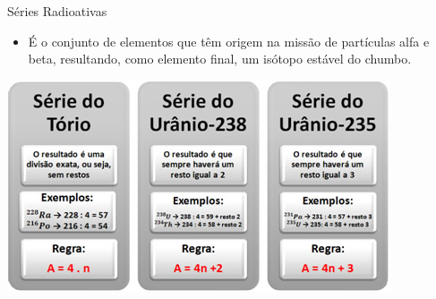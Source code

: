 \documentclass[presentation,professionalfonts,aspectratio=169]{beamer}
\begin{document}
\begin{frame}[label={sec:orgf94ec5a}]{Séries Radioativas}
\begin{itemize}
\item É o conjunto de elementos que têm origem na missão de partículas alfa e beta, resultando, como elemento final, um isótopo estável do chumbo.
\end{itemize}
\begin{center}
\includegraphics[width=.9\linewidth]{FQ/Radioatividade/serieradioativas.jpg}
\end{center}
\end{frame}
\end{document}
